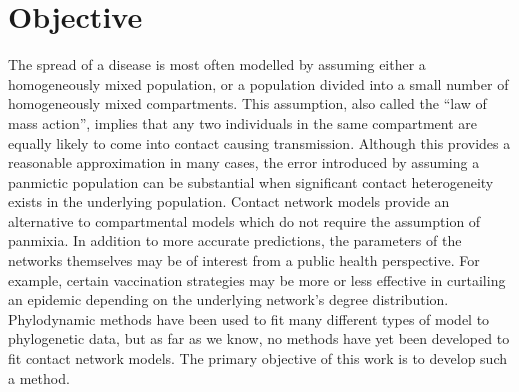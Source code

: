 \section{Objective}

The spread of a disease is most often modelled by assuming either a
homogeneously mixed population, or a population divided into a small number of
homogeneously mixed compartments. This assumption, also called the ``law of
mass action'', implies that any two individuals in the same compartment are
equally likely to come into contact causing transmission. Although this
provides a reasonable approximation in many cases, the error introduced by
assuming a panmictic population can be substantial when significant contact
heterogeneity exists in the underlying population. Contact network models
provide an alternative to compartmental models which do not require the
assumption of panmixia. In addition to more accurate predictions, the
parameters of the networks themselves may be of interest from a public health
perspective. For example, certain vaccination strategies may be more or less
effective in curtailing an epidemic depending on the underlying network's
degree distribution. Phylodynamic methods have been used to fit many different
types of model to phylogenetic data, but as far as we know, no methods have yet
been developed to fit contact network models. The primary objective of this
work is to develop such a method.

\newcommand{\G}{\mathcal{G}}
\newcommand{\Nu}{\mathcal{N}}

